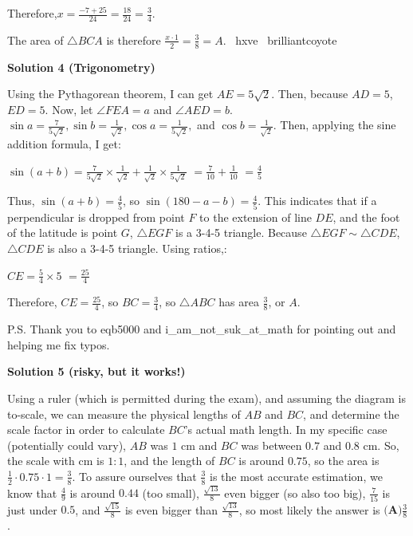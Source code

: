 \begin{enumerate}
 Therefore,$x = \frac{-7+25}{24}=\frac{18}{24}=\frac{3}{4}$.

 The area of $\triangle BCA$ is therefore $\frac{x \cdot 1}{2}=\frac{3}{8}=\boxed{A}$. ~hxve ~brilliantcoyote

 



\textbf{Solution 4 (Trigonometry)}

Using the Pythagorean theorem, I can get $AE=5 \sqrt{2}$. Then, because $AD=5$, $ED=5$. Now, let $\angle FEA=a$ and $\angle AED=b$. $\sin a=\frac{7}{5\sqrt{2}}, \sin b=\frac{1}{\sqrt{2}}, \cos a=\frac{1}{5\sqrt{2}},$ and $\cos b=\frac{1}{\sqrt{2}}$. Then, applying the sine addition formula, I get:

 $\sin(a+b)=\frac{7}{5\sqrt{2}}\times\frac{1}{\sqrt{2}}+\frac{1}{\sqrt{2}}\times\frac{1}{5\sqrt{2}}$
$=\frac{7}{10}+ \frac{1}{10}$
$=\frac{4}{5}$

 Thus, $\sin(a+b)=\frac{4}{5}$, so $\sin(180-a-b)=\frac{4}{5}$. This indicates that if a perpendicular is dropped from point $F$ to the extension of line $DE$, and the foot of the latitude is point $G$, $\triangle EGF$ is a 3-4-5 triangle. Because $\triangle EGF\sim\triangle CDE$, $\triangle CDE$ is also a 3-4-5 triangle. Using ratios,:

 $CE=\frac{5}{4}\times 5$
$=\frac{25}{4}$

 Therefore, $CE=\frac{25}{4}$, so $BC=\frac{3}{4}$, so $\triangle ABC$ has area $\frac{3}{8}$, or $\boxed A$.

 P.S. Thank you to eqb5000 and i\_am\_not\_suk\_at\_math for pointing out and helping me fix typos.

 



\textbf{Solution 5 (risky, but it works!)}

Using a ruler (which is permitted during the exam), and assuming the diagram is to-scale, we can measure the physical lengths of $AB$ and $BC$, and determine the scale factor in order to calculate $BC$'s actual math length. In my specific case (potentially could vary), $AB$ was $1$ cm and $BC$ was between $0.7$ and $0.8$ cm. So, the scale with cm is $1:1$, and the length of $BC$ is around $0.75$, so the area is $\frac{1}{2} \cdot 0.75 \cdot 1 = \frac{3}{8}$. To assure ourselves that $\frac{3}{8}$ is the most accurate estimation, we know that $\frac{4}{9}$ is around $0.44$ (too small), $\frac{\sqrt{13}}{8}$ even bigger (so also too big), $\frac{7}{15}$ is just under $0.5$, and $\frac{\sqrt{15}}{8}$ is even bigger than $\frac{\sqrt{13}}{8}$, so most likely the answer is $\boxed{\textbf{(A)} \frac{3}{8}}$.


\end{enumerate}

